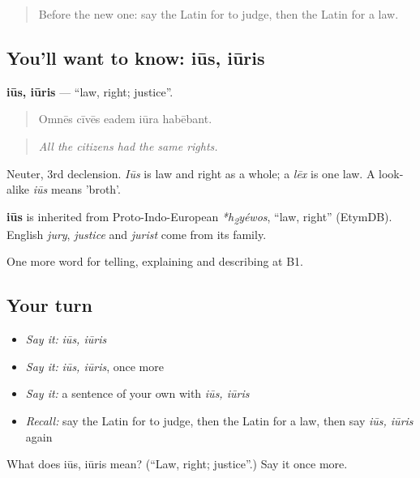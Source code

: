 \label{lesson:LA-C308-ius}



\begin{quote}
Before the new one: say the Latin for to judge, then the Latin for a law.
\end{quote}

\subsection*{You'll want to know: iūs, iūris}
\textbf{iūs, iūris} — \textquotedblleft{}law, right; justice\textquotedblright{}.

\begin{quote}
Omnēs cīvēs eadem iūra habēbant.
\end{quote}

\begin{quote}
\emph{All the citizens had the same rights.}
\end{quote}

Neuter, 3rd declension. \emph{Iūs} is law and right as a whole; a \emph{lēx} is one law. A look-alike \emph{iūs} means 'broth'.

\begin{cousinweb}
\textbf{iūs} is inherited from Proto-Indo-European \emph{*h\textsubscript{2}yéwos}, \textquotedblleft{}law, right\textquotedblright{} (EtymDB). English \emph{jury}, \emph{justice} and \emph{jurist} come from its family.
\end{cousinweb}

\begin{grammarlens}[title={What you've built}]
One more word for telling, explaining and describing at B1.
\end{grammarlens}

\subsection*{Your turn}
\begin{itemize}
\raggedright
  \item \emph{Say it:} \emph{iūs, iūris}
  \item \emph{Say it:} \emph{iūs, iūris}, once more
  \item \emph{Say it:} a sentence of your own with \emph{iūs, iūris}
  \item \emph{Recall:} say the Latin for to judge, then the Latin for a law, then say \emph{iūs, iūris} again
\end{itemize}

\begin{tcolorbox}[breakable,colback=teal!4,colframe=teal!35!black,title={Before you move on}]
What does iūs, iūris mean? (\textquotedblleft{}Law, right; justice\textquotedblright{}.) Say it once more.
\end{tcolorbox}
